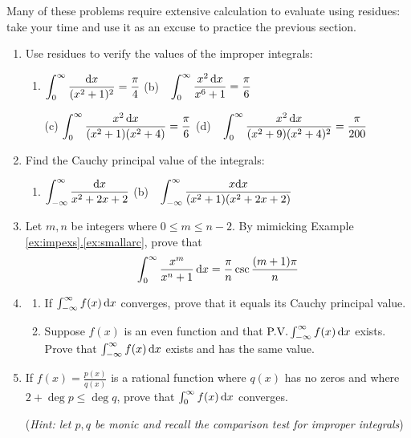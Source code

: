 \begin{exercises*}
\hangindent\leftmargini
Many of these problems require extensive calculation to evaluate using residues: take your time and use it as an excuse to practice the previous section.

\begin{enumerate}
  \item Use residues to verify the values of the improper integrals:
  \begin{enumerate}
    \item $\displaystyle\int_0^\infty\frac{{\mathrm{d} x}}{(x^2+1)^2}=\frac\pi 4$\qquad
    (b)\ \ $\displaystyle\int_0^\infty\frac{x^2\,{\mathrm{d} x}}{x^6+1}=\frac\pi 6$
    
    \item[(c)] $\displaystyle\int_0^\infty\frac{x^2\,{\mathrm{d} x}}{(x^2+1)(x^2+4)}=\frac\pi 6$\qquad
    (d)\ \ $\displaystyle\int_0^\infty\frac{x^2\,{\mathrm{d} x}}{(x^2+9)(x^2+4)^2}=\frac\pi{200}$
  \end{enumerate}
  
  \item Find the Cauchy principal value of the integrals:
  \begin{enumerate}
    \item $\displaystyle\int_{-\infty}^\infty\frac{{\mathrm{d} x}}{x^2+2x+2}$\qquad
    (b)\ \ $\displaystyle\int_{-\infty}^\infty\frac{x{\mathrm{d} x}}{(x^2+1)(x^2+2x+2)}$
  \end{enumerate}
  
  \item Let $m,n$ be integers where $0\le m\le n-2$. By mimicking Example \hyperref[ex:smallarc]{\ref*{ex:impexs}.\ref*{ex:smallarc}}, prove that
  \[\int_0^\infty\frac{x^m}{x^n+1}\,{\mathrm{d} x}=\frac\pi n\csc\frac{(m+1)\pi}n\]  
  
  \item\begin{enumerate}
    \item If $\int_{-\infty}^\infty f(x)\,{\mathrm{d} x}$ converges, prove that it equals its Cauchy principal value.
    
    \item Suppose $f(x)$ is an even function and that $\text{P.V.}\int_{-\infty}^\infty f(x)\,{\mathrm{d} x}$ exists. Prove that $\int_{-\infty}^\infty f(x)\,{\mathrm{d} x}$ exists and has the same value.
  \end{enumerate}
  
  \item\label{exs:rationalimpint} If $f(x)=\frac{p(x)}{q(x)}$ is a rational function where $q(x)$ has no zeros and where $2+\deg p\le\deg q$, prove that $\int_0^\infty f(x)\,{\mathrm{d} x}$ converges.\par
    (\emph{Hint: let $p,q$ be monic and recall the comparison test for improper integrals})



\end{enumerate}
\end{exercises*}
